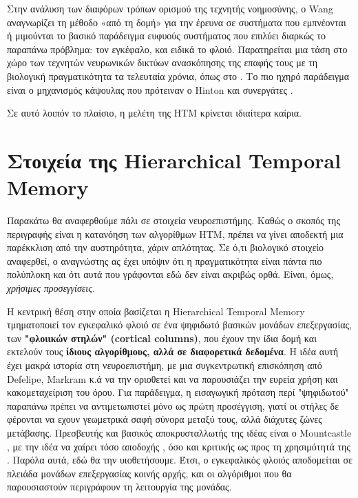 	Στην ανάλυση των διαφόρων τρόπων ορισμού της τεχνητής νοημοσύνης, ο Wang \parencite{wangWhatYouMean2008} αναγνωρίζει τη μέθοδο
	«από τη δομή» για την έρευνα σε συστήματα που εμπνέονται ή μιμούνται
	το βασικό παράδειγμα ευφυούς συστήματος που επιλύει διαρκώς το παραπάνω πρόβλημα: τον εγκέφαλο, και ειδικά το φλοιό.
	Παρατηρείται μια τάση στο χώρο των τεχνητών νευρωνικών δικτύων ανασκόπησης της επαφής τους με τη βιολογική πραγματικότητα τα τελευταία χρόνια,
	όπως στο \cite{bengioBiologicallyPlausibleDeep2015}.
	Το πιο ηχηρό παράδειγμα είναι ο μηχανισμός κάψουλας που πρότειναν ο Hinton και συνεργάτες \parencite{sabourMatrixCapsulesEM2018,sabourDynamicRoutingCapsules2017}.
	\smallskip

	Σε αυτό λοιπόν το πλαίσιο, η μελέτη της HTM κρίνεται ιδιαίτερα καίρια.

\section{Στοιχεία της Hierarchical Temporal Memory}

	Παρακάτω θα αναφερθούμε πάλι σε στοιχεία νευροεπιστήμης.
	Καθώς ο σκοπός της περιγραφής είναι η κατανόηση των αλγορίθμων HTM, πρέπει να γίνει αποδεκτή μια παρέκκλιση από την αυστηρότητα, χάριν απλότητας.
	Σε ό,τι βιολογικό στοιχείο αναφερθεί, ο αναγνώστης ας έχει υπόψιν ότι η πραγματικότητα είναι πάντα πιο πολύπλοκη και ότι αυτά που γράφονται εδώ δεν είναι ακριβώς ορθά.
	Είναι, όμως, \textit{χρήσιμες προσεγγίσεις}.

	Η κεντρική θέση στην οποία βασίζεται η Hierarchical Temporal Memory τμηματοποιεί τον εγκεφαλικό φλοιό σε ένα ψηφιδωτό βασικών μονάδων επεξεργασίας,
	των \textbf{"φλοιικών στηλών" (cortical columns)},
	που έχουν την ίδια δομή και εκτελούν τους \textbf{ίδιους αλγορίθμους, αλλά σε διαφορετικά δεδομένα}.
	Η ιδέα αυτή έχει μακρά ιστορία στη νευροεπιστήμη, με μια συγκεντρωτική επισκόπηση από Defelipe, Markram κ.ά \cite{defelipeNeocorticalColumn2012}
	να την οριοθετεί και να παρουσιάζει την ευρεία χρήση και κακομεταχείριση του όρου.
	Για παράδειγμα, η εισαγωγική πρόταση περί "ψηφιδωτού" παραπάνω πρέπει να αντιμετωπιστεί μόνο ως πρώτη προσέγγιση,
	γιατί οι στήλες δε φέρονται να εχουν γεωμετρικά σαφή σύνορα μεταξύ τους, αλλά διάχυτες ζώνες μετάβασης.
	Πρεσβευτής και βασικός αποκρυσταλλωτής της ιδέας είναι ο Mountcastle \parencite{mountcastleColumnarOrganizationNeocortex1997},
	με την ιδέα να χαίρει τόσο αποδοχής \parencite{haueisLifeCorticalColumn2016}, όσο και κριτικής ως προς τη χρησιμότητά της \parencite{hortonCorticalColumnStructure2005}.
	Παρόλα αυτά, εδώ θα την υιοθετήσουμε.
	Έτσι, ο εγκεφαλικός φλοιός αποδομείται σε πλειάδα μονάδων επεξεργασίας κοινής αρχής, και οι αλγόριθμοι που θα παρουσιαστούν περιγράφουν τη λειτουργία της μονάδας.


